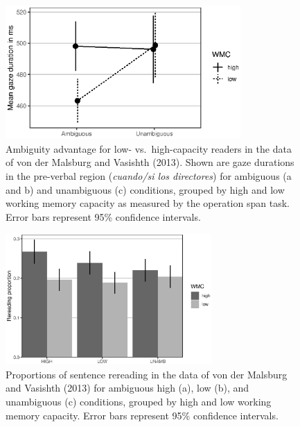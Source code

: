 \documentclass{cambridge7A}\usepackage[]{graphicx}\usepackage[]{color}
\newenvironment{knitrout}{}{} %
\begin{document}
\begin{figure}[!htbp]
  \centering
\begin{knitrout}
\color{fgcolor}

{\centering \includegraphics[width=0.8\textwidth]{figures/fig-mv13dataambadv-1} 

}



\end{knitrout}
  \caption[Ambiguity advantage in the pre-verbal region for low-capacity readers in the data of von der Malsburg and Vasishth (2013).]{Ambiguity advantage for low- vs.\ high-capacity readers in the data of von der Malsburg and Vasishth (2013). Shown are gaze durations in the pre-verbal region (\textit{cuando/si los directores}) for ambiguous (a and b) and unambiguous (c) conditions, grouped by high and low working memory capacity as measured by the operation span task.  Error bars represent 95\% confidence intervals.}\label{fig:mv13data:rt}
\end{figure}


\begin{figure}[!htbp]
\centering
\begin{knitrout}
\color{fgcolor}

{\centering \includegraphics[width=0.7\textwidth]{figures/fig-mv13datarer-1} 

}



\end{knitrout}
  \caption[Proportions of sentence rereading by working memory capacity in the data of von der Malsburg and Vasishth (2013).]{Proportions of sentence rereading in the data of von der Malsburg and Vasishth (2013) for ambiguous high (a), low (b), and unambiguous (c) conditions, grouped by high and low working memory capacity. Error bars represent 95\% confidence intervals.}
  \label{fig:mv13data:rer}
\end{figure}
\end{document}
